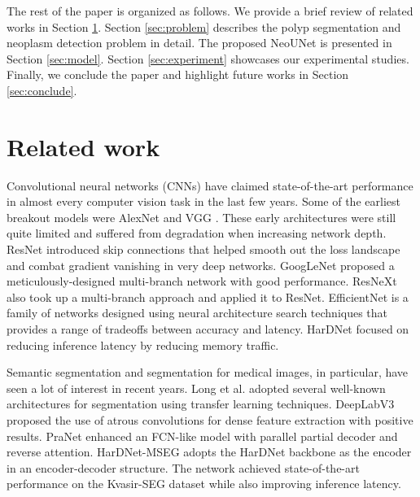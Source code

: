 \documentclass[runningheads]{llncs}
\newcommand{\ModelName}{NeoUNet\xspace}
\begin{document}
	The rest of the paper is organized as follows. We provide a brief review of related works in Section \ref{sec:related}. Section \ref{sec:problem} describes the polyp segmentation and neoplasm detection problem in detail. The proposed \ModelName is presented in Section \ref{sec:model}. Section \ref{sec:experiment} showcases our experimental studies. Finally, we conclude the paper and highlight future works in Section \ref{sec:conclude}.

	\section{Related work}
	\label{sec:related}
	Convolutional neural networks (CNNs) have claimed state-of-the-art performance in almost every computer vision task in the last few years. Some of the earliest breakout models were AlexNet \cite{krizhevsky2012imagenet} and VGG \cite{simonyan2014very}. These early architectures were still quite limited and suffered from degradation when increasing network depth. ResNet \cite{he2016deep} introduced skip connections that helped smooth out the loss landscape and combat gradient vanishing in very deep networks. GoogLeNet \cite{szegedy2015going} proposed a meticulously-designed multi-branch network with good performance. ResNeXt \cite{xie2017aggregated} also took up a multi-branch approach and applied it to ResNet. EfficientNet \cite{tan2019efficientnet} is a family of networks designed using neural architecture search techniques that provides a range of tradeoffs between accuracy and latency. HarDNet \cite{chao2019hardnet} focused on reducing inference latency by reducing memory traffic.

	Semantic segmentation and segmentation for medical images, in particular, have seen a lot of interest in recent years. Long et al. \cite{long2015fully} adopted several well-known architectures for segmentation using transfer learning techniques. DeepLabV3 \cite{chen2017rethinking} proposed the use of atrous convolutions for dense feature extraction with positive results. PraNet \cite{fan2020pranet} enhanced an FCN-like model with parallel partial decoder and reverse attention. HarDNet-MSEG \cite{huang2021hardnet} adopts the HarDNet backbone as the encoder in an encoder-decoder structure. The network achieved state-of-the-art performance on the Kvasir-SEG dataset while also improving inference latency.
\end{document}
